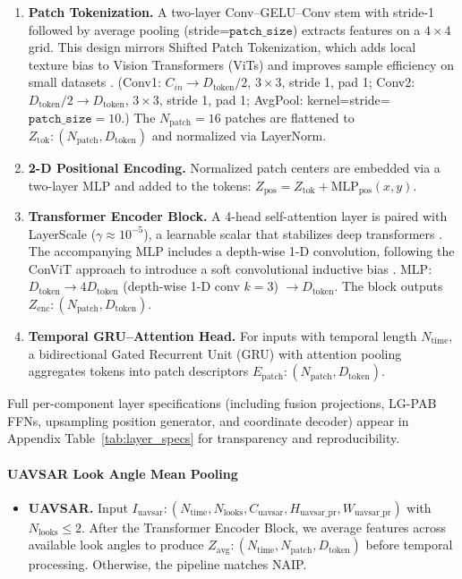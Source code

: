 \documentclass[remotesensing,article,submit,pdftex,moreauthors]{Definitions/mdpi}
\begin{document}
\begin{enumerate}[leftmargin=*]
\item \textbf{Patch Tokenization.}
      A two-layer Conv–GELU–Conv stem with stride-1 followed by average pooling (stride=$\texttt{patch\_size}$) extracts features on a $4\times4$ grid.
      This design mirrors Shifted Patch Tokenization, which adds local texture bias to Vision Transformers (ViTs) and improves sample efficiency on small datasets \cite{lee2021vision}.
  (Conv1: $C_{in}\rightarrow D_{\text{token}}/2$, $3\times3$, stride 1, pad 1; Conv2: $D_{\text{token}}/2\rightarrow D_{\text{token}}$, $3\times3$, stride 1, pad 1; AvgPool: kernel=stride=$\texttt{patch\_size}=10$.) The $N_{\text{patch}}=16$ patches are flattened to $Z_{\text{tok}}: (N_{\text{patch}}, D_{\text{token}})$ and normalized via LayerNorm.


\item \textbf{2-D Positional Encoding.}
      Normalized patch centers are embedded via a two-layer MLP and added to the tokens:
      $Z_{\text{pos}} = Z_{\text{tok}} + \text{MLP}_{\text{pos}}(x,y)$.

\item \textbf{Transformer Encoder Block.}
      A 4-head self-attention layer is paired with LayerScale ($\gamma \approx 10^{-5}$), a learnable scalar that stabilizes deep transformers \cite{touvron2021going}.
      The accompanying MLP includes a depth-wise 1-D convolution, following the ConViT approach to introduce a soft convolutional inductive bias \cite{dascoli2021convit}.
  MLP: $D_{\text{token}} \rightarrow 4 D_{\text{token}}$ (depth-wise 1-D conv $k=3$) $\rightarrow D_{\text{token}}$. The block outputs $Z_{\text{enc}}: (N_{\text{patch}}, D_{\text{token}})$.


\item \textbf{Temporal GRU–Attention Head.}
      For inputs with temporal length $N_{\text{time}}$, a bidirectional Gated Recurrent Unit (GRU) with attention pooling aggregates tokens into patch descriptors $E_{\text{patch}}: (N_{\text{patch}}, D_{\text{token}})$.
\end{enumerate}

Full per-component layer specifications (including fusion projections, LG-PAB FFNs, upsampling position generator, and coordinate decoder) appear in Appendix Table~\ref{tab:layer_specs} for transparency and reproducibility.

\paragraph{UAVSAR Look Angle Mean Pooling}
\begin{itemize}[leftmargin=*]
\item \textbf{UAVSAR.}
      Input $I_{\text{uavsar}}: (N_{\text{time}}, N_{\text{looks}}, C_{\text{uavsar}}, H_{\text{uavsar\_pr}}, W_{\text{uavsar\_pr}})$ with $N_{\text{looks}} \leq 2$.
      After the Transformer Encoder Block, we average features across available look angles to produce $Z_{\text{avg}}: (N_{\text{time}}, N_{\text{patch}}, D_{\text{token}})$ before temporal processing.
      Otherwise, the pipeline matches NAIP.
\end{itemize}
\end{document}
